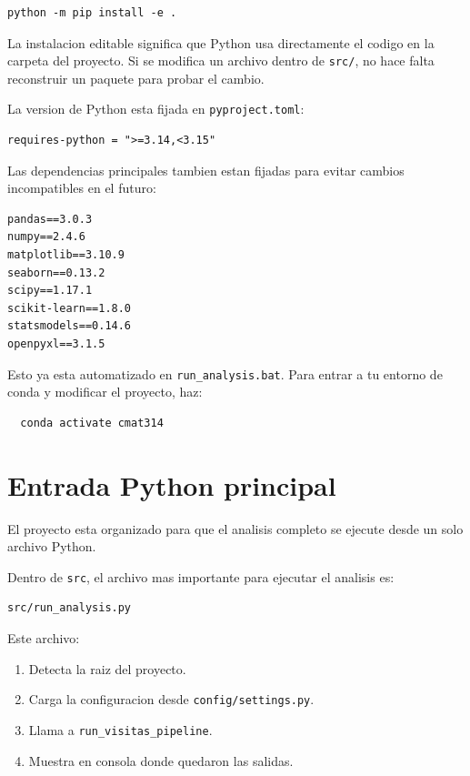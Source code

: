 \documentclass[11pt,letterpaper]{article}
\newcommand{\code}[1]{\texttt{#1}}
\begin{document}
\begin{verbatim}
python -m pip install -e .
\end{verbatim}

La instalacion editable significa que Python usa directamente el codigo en la
carpeta del proyecto. Si se modifica un archivo dentro de \code{src/}, no hace
falta reconstruir un paquete para probar el cambio.

La version de Python esta fijada en \code{pyproject.toml}:

\begin{verbatim}
requires-python = ">=3.14,<3.15"
\end{verbatim}


Las dependencias principales tambien estan fijadas para evitar cambios
incompatibles en el futuro:

\begin{verbatim}
pandas==3.0.3
numpy==2.4.6
matplotlib==3.10.9
seaborn==0.13.2
scipy==1.17.1
scikit-learn==1.8.0
statsmodels==0.14.6
openpyxl==3.1.5
\end{verbatim}

\begin{summary}
  Esto ya esta automatizado en \code{run\_analysis.bat}. Para entrar a tu entorno de conda y modificar el proyecto, haz:
  \begin{verbatim}
  conda activate cmat314
  \end{verbatim}
\end{summary}

\section{Entrada Python principal}

El proyecto esta organizado para que el analisis completo se ejecute desde un solo archivo Python.

\begin{summary}
Dentro de \code{src}, el archivo mas importante para ejecutar el analisis es:

\begin{verbatim}
src/run_analysis.py
\end{verbatim}
\end{summary}

Este archivo:

\begin{enumerate}
  \item Detecta la raiz del proyecto.
  \item Carga la configuracion desde \code{config/settings.py}.
  \item Llama a \code{run\_visitas\_pipeline}.
  \item Muestra en consola donde quedaron las salidas.
\end{enumerate}
\end{document}
